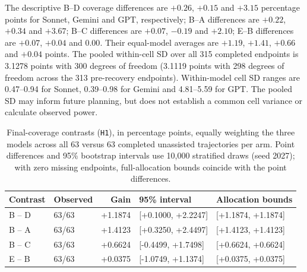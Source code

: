The descriptive B--D coverage differences are $+0.26$, $+0.15$ and $+3.15$
percentage points for Sonnet, Gemini and GPT, respectively; B--A differences
are $+0.22$, $+0.34$ and $+3.67$; B--C differences are $+0.07$, $-0.19$ and
$+2.10$; E--B differences are $+0.07$, $+0.04$ and $0.00$. Their equal-model
averages are $+1.19$, $+1.41$, $+0.66$ and $+0.04$ points. The pooled
within-cell SD over all 315 completed endpoints is 3.1278 points with 300
degrees of freedom (3.1119 points with 298 degrees of freedom across the
313 pre-recovery endpoints). Within-model cell SD ranges are 0.47--0.94 for
Sonnet, 0.39--0.98 for Gemini and 4.81--5.59 for GPT\@. The pooled SD may inform future planning, but does not establish a common
cell variance or calculate observed power.

\begin{table}[!htbp]
\centering\small
\caption{Final-coverage contrasts (\texttt{H1}), in percentage points,
equally weighting the three models across all 63 versus 63 completed
unassisted trajectories per arm. Point differences and 95\% bootstrap
intervals use 10,000 stratified draws (seed 2027); with zero missing
endpoints, full-allocation bounds coincide with the point differences.}\label{tab:resultsh1contrasts}

\begin{tabular*}{\textwidth}{@{\extracolsep{\fill}}llrll@{}}
\toprule
Contrast & Observed & Gain & 95\% interval & Allocation bounds \\
\midrule
B -- D & 63/63 & +1.1874 & [+0.1000, +2.2247] & [+1.1874, +1.1874] \\
B -- A & 63/63 & +1.4123 & [+0.3250, +2.4497] & [+1.4123, +1.4123] \\
B -- C & 63/63 & +0.6624 & [-0.4499, +1.7498] & [+0.6624, +0.6624] \\
E -- B & 63/63 & +0.0375 & [-1.0749, +1.1374] & [+0.0375, +0.0375] \\
\bottomrule
\end{tabular*}
\end{table}

